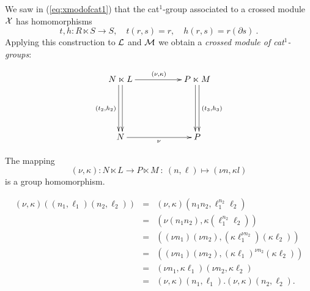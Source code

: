 
\medskip
We saw in (\ref{eq:xmodofcat1}) that the cat$^1$-group associated to a
crossed module $\mathcal{X}$ has homomorphisms
$$
t,h : R \ltimes S \to S, \quad t(r,s) = r, \quad h(r,s) = r(\partial s)~.
$$
Applying this construction to $\mathcal{L}$ and $\mathcal{M}$
we obtain a \emph{crossed module of cat$^1$-groups}:

\begin{equation} \label{eq:xmod-of-cat1s}
\vcenter{\xymatrix{
   N \ltimes L 
     \ar[dd]<+0.5ex> \ar[dd]<-0.5ex>_{(t_2,h_2)} \ar[rr]^{(\nu,\kappa)}
   &&  P \ltimes M \ar[dd]<-0.5ex> \ar[dd]<+0.5ex>^{(t_3,h_3)} \\
   &&  \\
   N \ar[rr]_{\nu} 
   &&  P 
}} 
\end{equation}

\begin{lem}
The mapping 
$$
(\nu,\kappa) : N \ltimes L \to P \ltimes M 
~:~ (n,\ell) \mapsto (\nu n, \kappa l) 
$$
is a group homomorphism. 
\end{lem}
\begin{pf}
\vspace{-5mm}
\begin{eqnarray*}
(\nu,\kappa)((n_1,\ell_1)(n_2,\ell_2)) 
  & = & (\nu,\kappa)(n_1n_2,\ell_1^{n_2}\ell_2) \\ 
  & = & (\nu(n_1n_2), \kappa(\ell_1^{n_2}\ell_2)) \\ 
  & = & ((\nu n_1)(\nu n_2), 
         (\kappa \ell_1^{\nu n_2})(\kappa \ell_2)) \\ 
  & = & ((\nu n_1)(\nu n_2), 
         (\kappa \ell_1)^{\nu n_2}(\kappa \ell_2)) \\ 
  & = & (\nu n_1, \kappa \ell_1)(\nu n_2, \kappa \ell_2) \\ 
  & = & (\nu,\kappa)(n_1,\ell_1).(\nu,\kappa)(n_2,\ell_2). 
\end{eqnarray*}
\end{pf}

